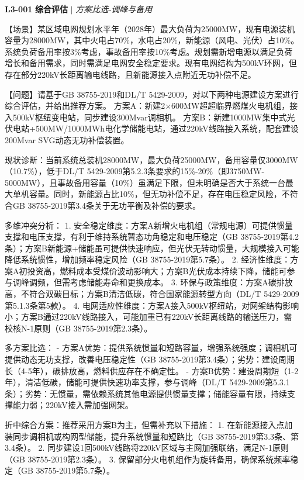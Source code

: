 \documentclass[11pt,a4paper]{ctexart}
\begin{document}
\noindent\textbf{L3-001} \hfill \textbf{综合评估} $|$ \textit{方案比选-调峰与备用}
\begin{description}[leftmargin=1.5em,style=nextline,font=\normalfont]
  \item[Q:] 【场景】某区域电网规划水平年（2028年）最大负荷为25000MW，现有电源装机容量为28000MW，其中火电占70\%，水电占20\%，新能源（风电、光伏）占10\%。系统负荷备用率按3\%考虑，事故备用率按10\%考虑。规划需新增电源以满足负荷增长和备用需求，同时需满足电网安全稳定要求。现有电网结构为500kV环网，但存在部分220kV长距离输电线路，且新能源接入点附近无功补偿不足。

【问题】请基于GB 38755-2019和DL/T 5429-2009，对以下两种电源建设方案进行综合评估，并给出推荐方案。
方案A：新建2×600MW超超临界燃煤火电机组，接入500kV枢纽变电站，同步建设300Mvar调相机。
方案B：新建1000MW集中式光伏电站+500MW/1000MWh电化学储能电站，通过220kV线路接入系统，配套建设200Mvar SVG动态无功补偿装置。
  \item[A:] 现状诊断：当前系统总装机28000MW，最大负荷25000MW，备用容量仅3000MW（10.7\%），低于DL/T 5429-2009第5.2.3条要求的15\%-20\%（即3750MW-5000MW），且事故备用容量（10\%）虽满足下限，但未明确是否大于系统一台最大单机容量。同时，新能源占比10\%，但无功补偿不足，存在电压稳定风险，不符合GB 38755-2019第3.4条关于无功平衡及补偿的要求。

多维冲突分析：
1. 安全稳定维度：方案A新增火电机组（常规电源）可提供惯量支撑和电压支撑，有利于维持系统暂态功角稳定和电压稳定（GB 38755-2019第4.2条）；方案B新能源+储能虽可提供快速响应，但光伏无转动惯量，大规模接入可能降低系统惯性，增加频率稳定风险（GB 38755-2019第5.7条）。
2. 经济性维度：方案A初投资高，燃料成本受煤价波动影响大；方案B光伏成本持续下降，储能可参与调峰调频，但需考虑储能寿命和更换成本。
3. 环保与政策维度：方案A碳排放高，不符合双碳目标；方案B清洁低碳，符合国家能源转型方向（DL/T 5429-2009第5.1.3条第5款）。
4. 电网适应性维度：方案A接入500kV枢纽站，对网架结构影响小；方案B通过220kV线路接入，可能加重已有220kV长距离线路的输送压力，需校核N-1原则（GB 38755-2019第2.3条）。

多方案比选：
- 方案A优势：提供系统惯量和短路容量，增强系统强度；调相机可提供动态无功支撑，改善电压稳定性（GB 38755-2019第3.4条）；劣势：建设周期长（4-5年），碳排放高，燃料供应存在不确定性。
- 方案B优势：建设周期短（1-2年），清洁低碳，储能可提供快速功率支撑，参与调峰（DL/T 5429-2009第5.3.1条）；劣势：无惯量，需依赖系统其他电源提供惯量支撑；储能容量有限，持续支撑能力弱；220kV接入需加强网架。

折中综合方案：推荐采用方案B为主，但需补充以下措施：
1. 在新能源接入点加装同步调相机或构网型储能，提升系统惯量和短路比（GB 38755-2019第3.3条、第3.4条）。
2. 同步建设1回500kV线路将220kV区域与主网加强联络，满足N-1原则（GB 38755-2019第2.3条）。
3. 保留部分火电机组作为旋转备用，确保系统频率稳定（GB 38755-2019第5.7条）。


\end{description}
\end{document}
